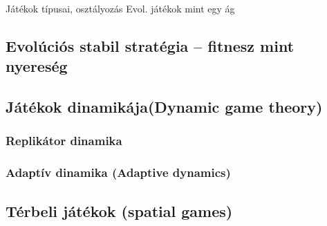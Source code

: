 Játékok típusai, osztályozás
Evol. játékok mint egy ág

\subsection{Evolúciós stabil stratégia -- fitnesz mint nyereség}
\subsection{Játékok dinamikája(Dynamic game theory)}
\subsubsection{Replikátor dinamika}
\subsubsection{Adaptív dinamika (Adaptive dynamics)}
\subsection{Térbeli játékok (spatial games)}

\fi

